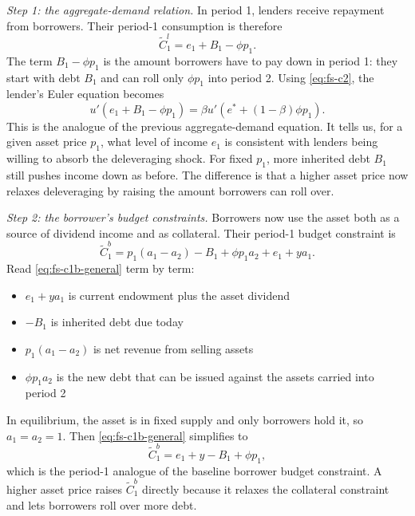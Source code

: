 \documentclass[11pt,a4paper]{article}
\begin{document}
\textit{Step 1: the aggregate-demand relation.} In period 1, lenders receive repayment from borrowers. Their period-1 consumption is therefore
\begin{equation}\label{eq:fs-c1l}
\tilde{C}_1^l=e_1+B_1-\phi p_1.
\end{equation}
The term $B_1-\phi p_1$ is the amount borrowers have to pay down in period 1: they start with debt $B_1$ and can roll only $\phi p_1$ into period 2. Using \eqref{eq:fs-c2}, the lender's Euler equation becomes
\begin{equation}\label{eq:fs-ad}
u'\!\left(e_1 + B_1 - \phi p_1\right)
=
\beta u'\!\left(e^* + (1-\beta)\phi p_1\right).
\end{equation}
This is the analogue of the previous aggregate-demand equation. It tells us, for a given asset price $p_1$, what level of income $e_1$ is consistent with lenders being willing to absorb the deleveraging shock. For fixed $p_1$, more inherited debt $B_1$ still pushes income down as before. The difference is that a higher asset price now relaxes deleveraging by raising the amount borrowers can roll over.

\textit{Step 2: the borrower's budget constraints.} Borrowers now use the asset both as a source of dividend income and as collateral. Their period-1 budget constraint is
\begin{equation}\label{eq:fs-c1b-general}
\tilde{C}_1^b
=
p_1(a_1-a_2)-B_1+\phi p_1 a_2+e_1+ya_1.
\end{equation}
Read \eqref{eq:fs-c1b-general} term by term:
\begin{itemize}
    \item $e_1+ya_1$ is current endowment plus the asset dividend
    \item $-B_1$ is inherited debt due today
    \item $p_1(a_1-a_2)$ is net revenue from selling assets
    \item $\phi p_1 a_2$ is the new debt that can be issued against the assets carried into period 2
\end{itemize}
In equilibrium, the asset is in fixed supply and only borrowers hold it, so $a_1=a_2=1$. Then \eqref{eq:fs-c1b-general} simplifies to
\begin{equation}\label{eq:fs-c1b}
\tilde{C}_1^b = e_1 + y - B_1 + \phi p_1,
\end{equation}
which is the period-1 analogue of the baseline borrower budget constraint. A higher asset price raises $\tilde{C}_1^b$ directly because it relaxes the collateral constraint and lets borrowers roll over more debt.
\end{document}
